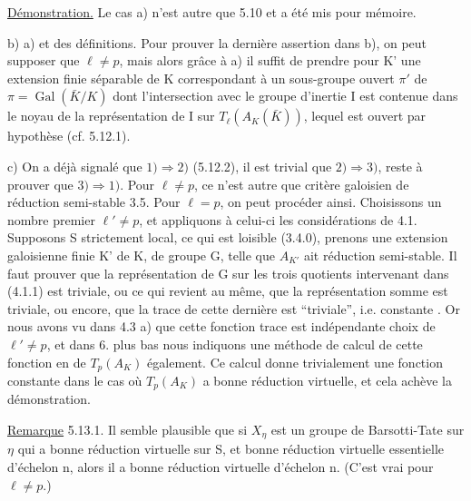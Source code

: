 
\uline{Démonstration.} Le cas a) n'est autre que 5.10 et a été mis pour mémoire.

b)  a) et des définitions. Pour prouver la dernière assertion dans b), on peut  supposer que $\ell\ne p$, mais alors grâce à a) il suffit de prendre pour K' une extension finie séparable de K correspondant à un sous-groupe ouvert $\pi'$ de $\pi=\operatorname{Gal}(\bar K/K)$ dont l'intersection avec le groupe d'inertie I est contenue dans le  noyau de la représentation de I sur $T_\ell(A_K(\bar K))$, lequel est  ouvert par hypothèse (cf. 5.12.1).

c) On a déjà signalé que $1)\Rightarrow2)$ (5.12.2), il est trivial que $2)\Rightarrow3)$, reste à prouver que $3)\Rightarrow1)$. Pour $\ell\ne p$, ce n'est autre que  critère galoisien de réduction semi-stable 3.5. Pour $\ell=p$, on peut procéder ainsi. Choisissons un nombre premier $\ell'\ne p$, et appliquons à celui-ci les considérations de 4.1.  Supposons S strictement local, ce qui est loisible (3.4.0), prenons une extension galoisienne finie K' de K, de groupe G, telle que $A_{K'}$ ait réduction semi-stable. Il faut prouver que la représentation de G sur les trois quotients intervenant dans (4.1.1) est triviale, ou ce qui revient au même, que la  représentation somme est triviale, ou encore, que la trace de cette dernière est ``triviale'', i.e. constante . Or nous avons vu dans 4.3 a) que cette fonction trace est indépendante  choix de $\ell'\ne p$, et dans 6. plus bas nous indiquons une méthode de calcul de cette fonction en  de $T_p(A_K)$ également. Ce calcul donne trivialement une fonction constante dans le cas où $T_p(A_K)$ a bonne réduction virtuelle, et cela achève la démonstration.

\uline{Remarque} 5.13.1. Il semble plausible que si $X_\eta$ est un  groupe de Barsotti-Tate sur $\eta$ qui a bonne réduction virtuelle sur S, et bonne réduction virtuelle essentielle d'échelon n, alors il a bonne réduction virtuelle d'échelon n. (C'est  vrai pour $\ell\ne p$.)
